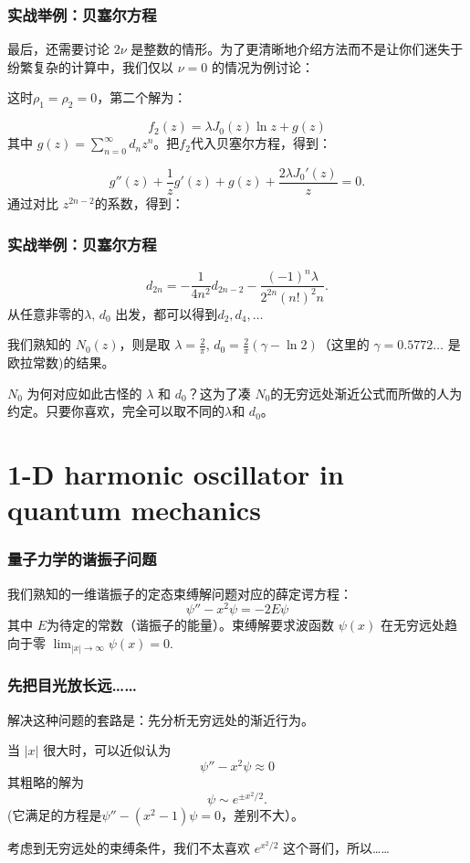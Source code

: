\documentclass[CJK]{beamer}
\begin{document}
\begin{frame}
  \frametitle{实战举例：贝塞尔方程}

  最后，还需要讨论 $2\nu$ 是整数的情形。为了更清晰地介绍方法而不是让你们迷失于纷繁复杂的计算中，我们仅以 $\nu=0$ 的情况为例讨论：

  这时$\rho_1=\rho_2=0$，第二个解为：

  $$ f_2(z) = \lambda J_0(z)\ln z + g(z)$$
  其中 $g(z)= \sum_{n=0}^\infty d_n z^n$。把$f_2$代入贝塞尔方程，得到：

  $$g''(z) + \frac{1}{z}g'(z) + g(z) +\frac{2\lambda J_0'(z)}{z} = 0.$$
  通过对比 $z^{2n-2}$的系数，得到：  
\end{frame}




\begin{frame}
  \frametitle{实战举例：贝塞尔方程}
  $$ d_{2n}= -\frac{1}{4n^2} d_{2n-2}-\frac{(-1)^n\lambda}{ 2^{2n}(n!)^2n }.$$
  从任意非零的$\lambda$, $d_0$ 出发，都可以得到$d_2,d_4,\ldots$

  \skipline
  
  我们熟知的 $N_0(z)$，则是取 $\lambda = \frac{2}{\pi}$, $d_0 = \frac{2}{\pi}\left(\gamma-\ln 2\right)$（这里的 $\gamma=0.5772\ldots$ 是欧拉常数)的结果。

    \skipline
    
   $N_0$ 为何对应如此古怪的 $\lambda$ 和 $d_0$？这为了凑 $N_0$的无穷远处渐近公式而所做的人为约定。只要你喜欢，完全可以取不同的$\lambda$和 $d_0$。
\end{frame}


\section{1-D harmonic oscillator in quantum mechanics}

\begin{frame}
  \frametitle{量子力学的谐振子问题}
  我们熟知的一维谐振子的定态束缚解问题对应的薛定谔方程：
  $$\psi'' - x^2\psi = -2E\psi $$
  其中 $E$为待定的常数（谐振子的能量）。束缚解要求波函数 $\psi(x)$ 在无穷远处趋向于零 $\lim_{|x|\rightarrow\infty}\psi(x) = 0.$
  
\end{frame}


\begin{frame}
  \frametitle{先把目光放长远……}
  解决这种问题的套路是：先分析无穷远处的渐近行为。

  当 $|x|$ 很大时，可以近似认为
  $$\psi''- x^2\psi \approx 0$$
  其粗略的解为
  $$ \psi \sim e^{\pm x^2/2}.$$
  (它满足的方程是$\psi''- (x^2-1)\psi = 0$，差别不大）。

  考虑到无穷远处的束缚条件，我们不太喜欢 $e^{x^2/2}$ 这个哥们，所以……
\end{frame}
\end{document}
